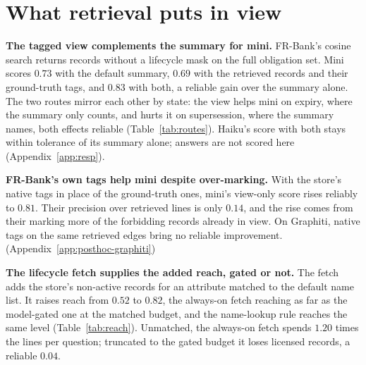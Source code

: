 \documentclass{article}
\newcommand{\claim}[1]{\textbf{#1}}
\begin{document}
\section{What retrieval puts in view}\label{sec:downstream}\label{sec:routes}\label{sec:retrieval}
\claim{The tagged view complements the summary for mini.}
FR-Bank's cosine search returns records without a lifecycle mask on the full obligation set. Mini scores $0.73$ with the default summary, $0.69$ with the retrieved records and their ground-truth tags, and $0.83$ with both, a reliable gain over the summary alone. The two routes mirror each other by state: the view helps mini on expiry, where the summary only counts, and hurts it on supersession, where the summary names, both effects reliable (Table~\ref{tab:routes}). Haiku's score with both stays within tolerance of its summary alone; answers are not scored here (Appendix~\ref{app:resp}).

\claim{FR-Bank's own tags help mini despite over-marking.}
With the store's native tags in place of the ground-truth ones, mini's view-only score rises reliably to $0.81$. Their precision over retrieved lines is only $0.14$, and the rise comes from their marking more of the forbidding records already in view. On Graphiti, native tags on the same retrieved edges bring no reliable improvement. (Appendix~\ref{app:posthoc-graphiti})

\claim{The lifecycle fetch supplies the added reach, gated or not.}
The fetch adds the store's non-active records for an attribute matched to the default name list. It raises reach from $0.52$ to $0.82$, the always-on fetch reaching as far as the model-gated one at the matched budget, and the name-lookup rule reaches the same level (Table~\ref{tab:reach}). Unmatched, the always-on fetch spends $1.20$ times the lines per question; truncated to the gated budget it loses licensed records, a reliable $0.04$.
\end{document}
